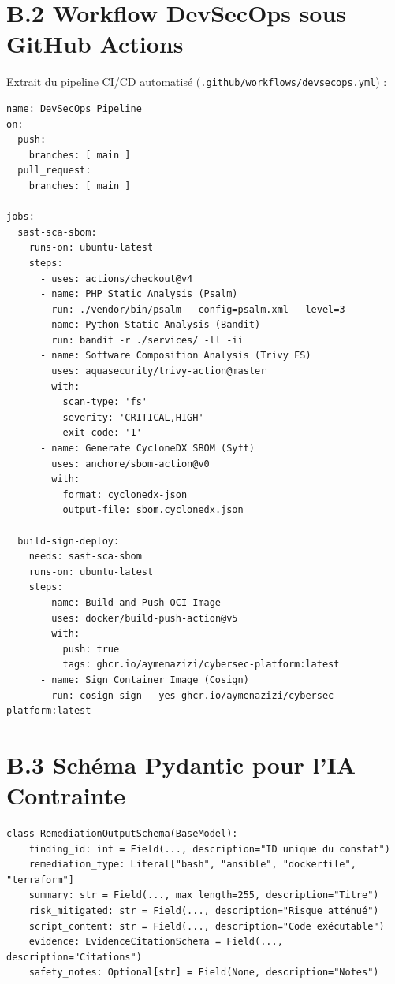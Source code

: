 \section*{B.2 Workflow DevSecOps sous GitHub Actions}
\par Extrait du pipeline CI/CD automatis\'e (\texttt{.github/workflows/devsecops.yml}) :
{\footnotesize
\begin{verbatim}
name: DevSecOps Pipeline
on:
  push:
    branches: [ main ]
  pull_request:
    branches: [ main ]

jobs:
  sast-sca-sbom:
    runs-on: ubuntu-latest
    steps:
      - uses: actions/checkout@v4
      - name: PHP Static Analysis (Psalm)
        run: ./vendor/bin/psalm --config=psalm.xml --level=3
      - name: Python Static Analysis (Bandit)
        run: bandit -r ./services/ -ll -ii
      - name: Software Composition Analysis (Trivy FS)
        uses: aquasecurity/trivy-action@master
        with:
          scan-type: 'fs'
          severity: 'CRITICAL,HIGH'
          exit-code: '1'
      - name: Generate CycloneDX SBOM (Syft)
        uses: anchore/sbom-action@v0
        with:
          format: cyclonedx-json
          output-file: sbom.cyclonedx.json

  build-sign-deploy:
    needs: sast-sca-sbom
    runs-on: ubuntu-latest
    steps:
      - name: Build and Push OCI Image
        uses: docker/build-push-action@v5
        with:
          push: true
          tags: ghcr.io/aymenazizi/cybersec-platform:latest
      - name: Sign Container Image (Cosign)
        run: cosign sign --yes ghcr.io/aymenazizi/cybersec-platform:latest
\end{verbatim}
}

\section*{B.3 Sch\'ema Pydantic pour l'IA Contrainte}
{\footnotesize
\begin{verbatim}
class RemediationOutputSchema(BaseModel):
    finding_id: int = Field(..., description="ID unique du constat")
    remediation_type: Literal["bash", "ansible", "dockerfile", "terraform"]
    summary: str = Field(..., max_length=255, description="Titre")
    risk_mitigated: str = Field(..., description="Risque atténué")
    script_content: str = Field(..., description="Code exécutable")
    evidence: EvidenceCitationSchema = Field(..., description="Citations")
    safety_notes: Optional[str] = Field(None, description="Notes")
\end{verbatim}
}

